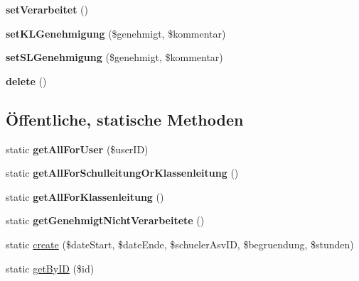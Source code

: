 \begin{DoxyCompactItemize}
{\bfseries set\+Verarbeitet} ()
\item 
\mbox{\label{class_absenz_beurlaubung_antrag_a04aa8a37184259aff45a797f9304a7f2}} 
{\bfseries set\+K\+L\+Genehmigung} (\$genehmigt, \$kommentar)
\item 
\mbox{\label{class_absenz_beurlaubung_antrag_a6e75e76e4ccf872abbe8f3f70e802e1d}} 
{\bfseries set\+S\+L\+Genehmigung} (\$genehmigt, \$kommentar)
\item 
\mbox{\label{class_absenz_beurlaubung_antrag_a5daf3f75e779c9167610519630903a32}} 
{\bfseries delete} ()
\end{DoxyCompactItemize}
\subsection*{Öffentliche, statische Methoden}
\begin{DoxyCompactItemize}
\item 
\mbox{\label{class_absenz_beurlaubung_antrag_adc31cf2471d8be8253cf5b509cb3d5c1}} 
static {\bfseries get\+All\+For\+User} (\$user\+ID)
\item 
\mbox{\label{class_absenz_beurlaubung_antrag_a9fa937c8d3c3c1d0208aec630d87276b}} 
static {\bfseries get\+All\+For\+Schulleitung\+Or\+Klassenleitung} ()
\item 
\mbox{\label{class_absenz_beurlaubung_antrag_a10fa12cedf94dd1acd0ce75478f4f14a}} 
static {\bfseries get\+All\+For\+Klassenleitung} ()
\item 
\mbox{\label{class_absenz_beurlaubung_antrag_a469b2621a01802a6288fdaf480799295}} 
static {\bfseries get\+Genehmigt\+Nicht\+Verarbeitete} ()
\item 
static \mbox{\hyperlink{class_absenz_beurlaubung_antrag_a0529dc1c39b85fe969ae277545c25232}{create}} (\$date\+Start, \$date\+Ende, \$schueler\+Asv\+ID, \$begruendung, \$stunden)
\item 
static \mbox{\hyperlink{class_absenz_beurlaubung_antrag_ae7b7d21c79f140d4bebc067965003a79}{get\+By\+ID}} (\$id)
\end{DoxyCompactItemize}


